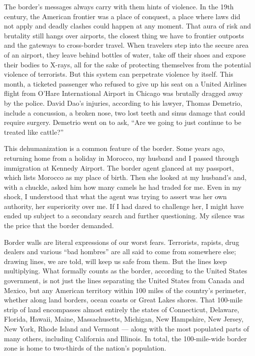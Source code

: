 The border's messages always carry with them hints of violence. In the
19th century, the American frontier was a place of conquest, a place
where laws did not apply and deadly clashes could happen at any moment.
That aura of risk and brutality still hangs over airports, the closest
thing we have to frontier outposts and the gateways to cross-border
travel. When travelers step into the secure area of an airport, they
leave behind bottles of water, take off their shoes and expose their
bodies to X-rays, all for the sake of protecting themselves from the
potential violence of terrorists. But this system can perpetrate
violence by itself. This month, a ticketed passenger who refused to give
up his seat on a United Airlines flight from O'Hare International
Airport in Chicago was brutally dragged away by the police. David Dao's
injuries, according to his lawyer, Thomas Demetrio, include a
concussion, a broken nose, two lost teeth and sinus damage that could
require surgery. Demetrio went on to ask, ``Are we going to just
continue to be treated like cattle?''

This dehumanization is a common feature of the border. Some years ago,
returning home from a holiday in Morocco, my husband and I passed
through immigration at Kennedy Airport. The border agent glanced at my
passport, which lists Morocco as my place of birth. Then she looked at
my husband's and, with a chuckle, asked him how many camels he had
traded for me. Even in my shock, I understood that what the agent was
trying to assert was her own authority, her superiority over me. If I
had dared to challenge her, I might have ended up subject to a secondary
search and further questioning. My silence was the price that the border
demanded.

Border walls are literal expressions of our worst fears. Terrorists,
rapists, drug dealers and various ``bad hombres'' are all said to come
from somewhere else; drawing lines, we are told, will keep us safe from
them. But the lines keep multiplying. What formally counts as the
border, according to the United States government, is not just the lines
separating the United States from Canada and Mexico, but any American
territory within 100 miles of the country's perimeter, whether along
land borders, ocean coasts or Great Lakes shores. That 100-mile strip of
land encompasses almost entirely the states of Connecticut, Delaware,
Florida, Hawaii, Maine, Massachusetts, Michigan, New Hampshire, New
Jersey, New York, Rhode Island and Vermont --- along with the most
populated parts of many others, including California and Illinois. In
total, the 100-mile-wide border zone is home to two-thirds of the
nation's population.

